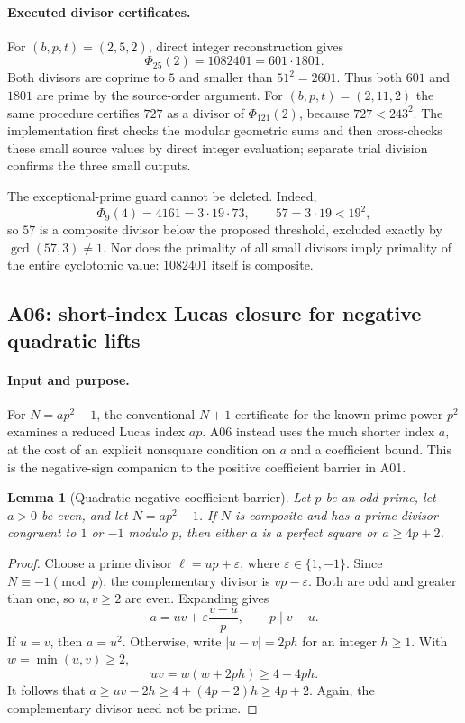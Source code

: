 \documentclass[11pt,a4paper]{article}
\newtheorem{lemma}[theorem]{Lemma}
\theoremstyle{definition}\newtheorem{definition}[theorem]{Definition}
\theoremstyle{remark}\newtheorem{remark}[theorem]{Remark}
\begin{document}
\paragraph{Executed divisor certificates.}
For $(b,p,t)=(2,5,2)$, direct integer reconstruction gives
\[
 \Phi_{25}(2)=1082401=601\cdot1801.
\]
Both divisors are coprime to $5$ and smaller than $51^2=2601$.
Thus both $601$ and $1801$ are prime by the source-order argument.
For $(b,p,t)=(2,11,2)$ the same procedure certifies $727$ as a divisor of
$\Phi_{121}(2)$, because $727<243^2$. The implementation first checks
the modular geometric sums and then cross-checks these small source values
by direct integer evaluation; separate trial division confirms the three
small outputs.

The exceptional-prime guard cannot be deleted. Indeed,
\[
 \Phi_9(4)=4161=3\cdot19\cdot73,
 \qquad 57=3\cdot19<19^2,
\]
so $57$ is a composite divisor below the proposed threshold, excluded exactly
by $\gcd(57,3)\ne1$. Nor does the primality of all small divisors imply
primality of the entire cyclotomic value: $1082401$ itself is composite.

\subsection{A06: short-index Lucas closure for negative quadratic lifts}
\label{sec:a06}

\paragraph{Input and purpose.}
For $N=ap^2-1$, the conventional $N+1$ certificate for the known prime
power $p^2$ examines a reduced Lucas index $ap$. A06 instead uses the much
shorter index $a$, at the cost of an explicit nonsquare condition on $a$
and a coefficient bound. This is the negative-sign companion to the
positive coefficient barrier in A01.

\begin{lemma}[Quadratic negative coefficient barrier]\label{lem:a06-barrier}
Let $p$ be an odd prime, let $a>0$ be even, and let $N=ap^2-1$.
If $N$ is composite and has a prime divisor congruent to $1$ or $-1$
modulo $p$, then either $a$ is a perfect square or $a\ge4p+2$.
\end{lemma}
\begin{proof}
Choose a prime divisor $\ell=up+\varepsilon$, where
$\varepsilon\in\{1,-1\}$. Since $N\equiv-1\pmod p$, the complementary
divisor is $vp-\varepsilon$. Both are odd and greater than one, so
$u,v\ge2$ are even. Expanding gives
\[
 a=uv+\varepsilon\frac{v-u}{p},\qquad p\mid v-u.
\]
If $u=v$, then $a=u^2$. Otherwise, write
$|u-v|=2ph$ for an integer $h\ge1$. With $w=\min(u,v)\ge2$,
\[
 uv=w(w+2ph)\ge4+4ph.
\]
It follows that $a\ge uv-2h\ge4+(4p-2)h\ge4p+2$.
Again, the complementary divisor need not be prime.
\end{proof}
\end{document}
